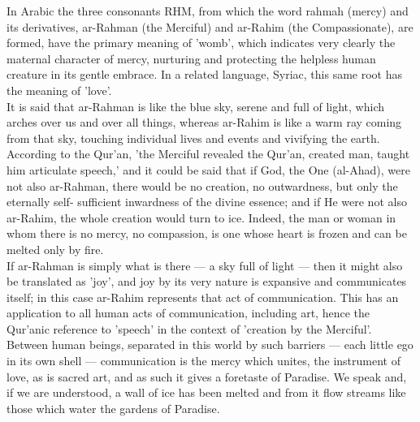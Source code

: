 \documentclass[10pt, twoside]{book}
\begin{document}
In Arabic the three consonants RHM, from which the word rahmah (mercy) and its derivatives, ar\hyp{}Rahman 
(the Merciful) and ar\hyp{}Rahim (the Compassionate), are formed, have the primary meaning of 'womb', 
which indicates very clearly the maternal character of mercy, nurturing and protecting the helpless 
human creature in its gentle embrace. In a related language, Syriac, this same root has the meaning 
of 'love'. \\

It is said that ar\hyp{}Rahman is like the blue sky, serene and full of light, which arches over us and 
over all things, whereas ar\hyp{}Rahim is like a warm ray coming from that sky, touching individual lives 
and events and vivifying the earth. According to the Qur'an, 'the Merciful revealed the Qur'an, 
created man, taught him articulate speech,' and it could be said that if God, the One (al\hyp{}Ahad), were 
not also ar\hyp{}Rahman, there would be no creation, no outwardness, but only the eternally self\hyp{}
sufficient inwardness of the divine essence; and if He were not also ar\hyp{}Rahim, the whole creation 
would turn to ice. Indeed, the man or woman in whom there is no mercy, no compassion, is one whose 
heart is frozen and can be melted only by fire. \\

If ar-Rahman is simply what is there --- a sky full of light --- then it might also be translated as 
'joy', and joy by its very nature is expansive and communicates itself; in this case ar\hyp{}Rahim 
represents that act of communication. This has an application to all human acts of communication, 
including art, hence the Qur'anic reference to 'speech' in the context of 'creation by the Merciful'. 
Between human beings, separated in this world by such barriers --- each little ego in its own shell --- 
communication is the mercy which unites, the instrument of love, as is sacred art, and as such it 
gives a foretaste of Paradise. We speak and, if we are understood, a wall of ice has been melted and 
from it flow streams like those which water the gardens of Paradise. \\
\end{document}
